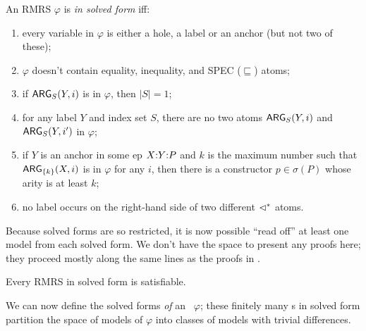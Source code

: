 \begin{definition}\label{defn:solved-forms}
  An RMRS $\varphi$ is \emph{in solved form} iff:
  \begin{enumerate}
  \item every variable in $\varphi$ is either a hole, a label or an
    anchor (but not two of these);
  \item $\varphi$ doesn't contain equality, inequality, and SPEC
    ($\sqsubseteq$) atoms;
  \item if $\mathsf{ARG}_S(Y,i)$ is in $\varphi$, then $|S| = 1$;
  \item for any label $Y$ and index set $S$, there
    are no two atoms $\mathsf{ARG}_S(Y,i)$ and $\mathsf{ARG}_S(Y,i')$ in $\varphi$;
  \item if $Y$ is an anchor in some {\sc ep} $X {:} Y {:} P$ and $k$ is the
    maximum number such that $\mathsf{ARG}_{\{k\}}(X,i)$ is in $\varphi$ for
    any $i$, then there is a constructor $p \in \sigma(P)$ whose arity
    is at least $k$;
  \item no label occurs on the right-hand side of two
    different $\lhd^*$ atoms.
  \end{enumerate}
\end{definition}

Because solved forms are so restricted, it is now possible ``read
off'' at least one model from each solved form.  We don't have the
space to present any proofs here; they proceed mostly along the same
lines as the proofs in .

\begin{prop} \label{prop:solved-forms-are-satisfiable}
  Every RMRS in solved form is satisfiable.
\end{prop}


We can now define the solved forms \emph{of} an \rmrs\ $\varphi$;
these finitely many \rmrs s in solved form partition the space of
models of $\varphi$ into classes of models with trivial differences.

